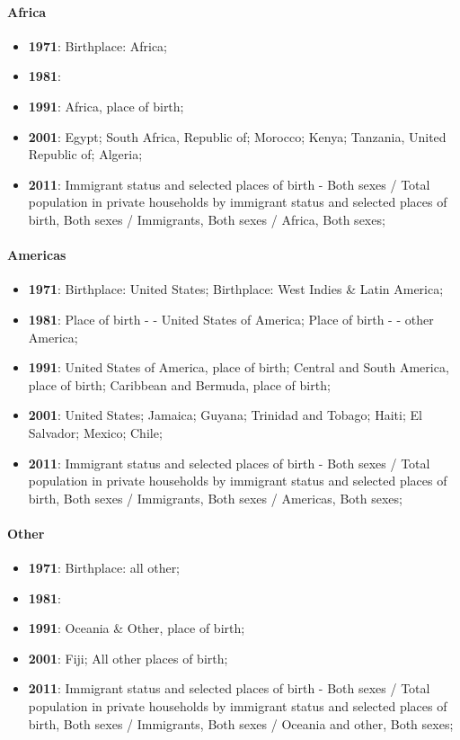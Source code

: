 \documentclass[a4paper]{article}
\begin{document}
\paragraph{Africa}
\begin{itemize}
   \item{\textbf{1971}:  Birthplace: Africa;}
   \item{\textbf{1981}: }
   \item{\textbf{1991}:  Africa, place of birth;}
   \item{\textbf{2001}:  Egypt; South Africa, Republic of; Morocco; Kenya; Tanzania, United Republic of; Algeria;}
   \item{\textbf{2011}:  Immigrant status and selected places of birth - Both sexes / Total population in private households by immigrant status and selected places of birth, Both sexes / Immigrants, Both sexes / Africa, Both sexes;}
\end{itemize}

\paragraph{Americas}
\begin{itemize}
   \item{\textbf{1971}:  Birthplace: United States; Birthplace: West Indies \& Latin America;}
   \item{\textbf{1981}:  Place of birth - - United States of America; Place of birth - - other America;}
   \item{\textbf{1991}:  United States of America, place of birth; Central and South America, place of birth; Caribbean and Bermuda, place of birth;}
   \item{\textbf{2001}:  United States; Jamaica; Guyana; Trinidad and Tobago; Haiti; El Salvador; Mexico; Chile;}
   \item{\textbf{2011}:  Immigrant status and selected places of birth - Both sexes / Total population in private households by immigrant status and selected places of birth, Both sexes / Immigrants, Both sexes / Americas, Both sexes;}
\end{itemize}

\paragraph{Other}
\begin{itemize}
   \item{\textbf{1971}:  Birthplace: all other;}
   \item{\textbf{1981}: }
   \item{\textbf{1991}:  Oceania \& Other, place of birth;}
   \item{\textbf{2001}:  Fiji; All other places of birth;}
   \item{\textbf{2011}:  Immigrant status and selected places of birth - Both sexes / Total population in private households by immigrant status and selected places of birth, Both sexes / Immigrants, Both sexes / Oceania and other, Both sexes;}
\end{itemize}
\end{document}
